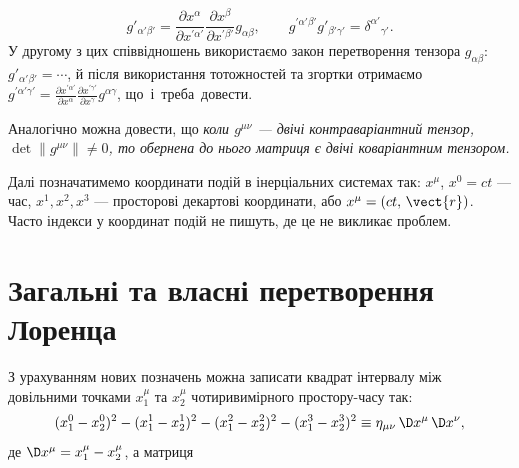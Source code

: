 \begin{equation*}
  g'_{\alpha'\beta'} = \frac{\partial x^\alpha}{\partial x^{\prime\alpha'}}
  \frac{\partial x^\beta}{\partial x^{\prime\beta'}}
  g_{\alpha\beta},\qquad
  g^{\prime\alpha'\beta'} g'_{\beta'\gamma'} = \delta^{\alpha'}{}_{\gamma'}.
\end{equation*}
У другому з цих співвідношень використаємо закон перетворення тензора $g_{\alpha\beta}$: $g'_{\alpha'\beta'} = \cdots$,
й після використання тотожностей та згортки отримаємо $g^{\prime\alpha'\gamma'} = \frac{\partial
x^{\prime\alpha'}}{\partial x^\alpha} \frac{\partial x^{\prime\gamma'}}{\partial x^\gamma} g^{\alpha\gamma}$,
що~і~треба~довести.

Аналогічно можна довести, що \textit{коли $g^{\mu\nu}$ --- двічі контраваріантний тензор, $\det\|g^{\mu\nu}\| \ne 0$, то
обернена до нього матриця є двічі коваріантним тензором.}

Далі позначатимемо координати подій в інерціальних системах так: $x^\mu$, $x^0 = ct$ --- час, $x^1, x^2, x^3$ ---
просторові декартові координати, або $x^\mu = (ct,\,\vect{r})$. Часто індекси у координат подій не пишуть, де це не
викликає проблем.

\section{Загальні та власні перетворення Лоренца}\label{sec:general_Lorentz_transformation}

З урахуванням нових позначень можна записати квадрат інтервалу між довільними точками $x_1^\mu$ та $x_2^\mu$
чотиривимірного простору-часу так:
\begin{equation*}
  (x_1^0-x_2^0)^2 - (x_1^1-x_2^1)^2 - (x_1^2-x_2^2)^2 - (x_1^3-x_2^3)^2
  \equiv \eta_{\mu\nu}\,\D x^\mu\,\D x^\nu,
\end{equation*}
де $\D x^\mu = x_1^\mu - x_2^\mu$, а матриця

